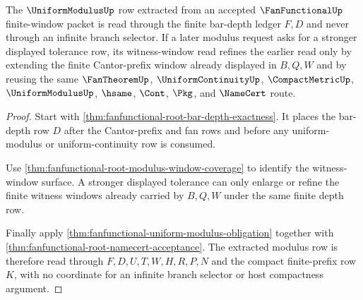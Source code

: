 \begin{theorem}
\label{thm:fan-functional-modulus-window-monotonicity}
The $\UniformModulusUp$ row extracted from an accepted $\FanFunctionalUp$ finite-window packet is read through the finite bar-depth ledger $F,D$ and never through an infinite branch selector. If a later modulus request asks for a stronger displayed tolerance row, its witness-window read refines the earlier read only by extending the finite Cantor-prefix window already displayed in $B,Q,W$ and by reusing the same $\FanTheoremUp$, $\UniformContinuityUp$, $\CompactMetricUp$, $\UniformModulusUp$, $\hsame$, $\Cont$, $\Pkg$, and $\NameCert$ route.
\end{theorem}
\begin{proof}
Start with \autoref{thm:fanfunctional-root-bar-depth-exactness}. It places the bar-depth row $D$ after the Cantor-prefix and fan rows and before any uniform-modulus or uniform-continuity row is consumed.

Use \autoref{thm:fanfunctional-root-modulus-window-coverage} to identify the witness-window surface. A stronger displayed tolerance can only enlarge or refine the finite witness windows already carried by $B,Q,W$ under the same finite depth row.

Finally apply \autoref{thm:fanfunctional-uniform-modulus-obligation} together with \autoref{thm:fanfunctional-root-namecert-acceptance}. The extracted modulus row is therefore read through $F,D,U,T,W,H,R,P,N$ and the compact finite-prefix row $K$, with no coordinate for an infinite branch selector or host compactness argument.
\end{proof}

